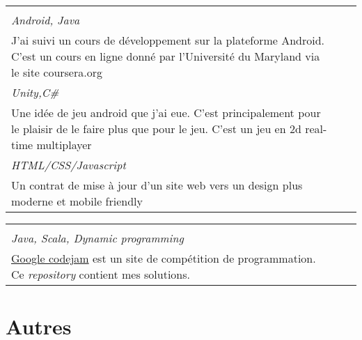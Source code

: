 \documentclass[a4paper,10pt]{extarticle}
\makeatletter
\newlength{\indicewidth}%
\newlength{\separatorcolumnwidth}%
\newlength{\maincolumnwidth}%
\newcommand{\indicestyle}[1]{\slshape\textcolor{color0}{#1}}
\newcommand{\cvboxitem}[5]{}
\renewcommand{\cvboxitem}[5]{%
	\begin{minipage}[t]{\linewidth}
	
	$\bullet$ \textbf{#1}\ifthenelse{\equal{#2}{}}{}{, {\slshape #2}}\par%
	\raggedright{\scriptsize\href{#3}{#3}}\\
	{\small\slshape\color{Bittersweet} {#4}}\vspace{0.2em}\\
	{#5}

	\end{minipage}
	
}
\newcommand{\cvtriplebox}[3]{}
\renewcommand{\cvtriplebox}[3]{
\begin{tabular*}{\linewidth}{  
                   p{\dimexpr 0.33\linewidth-1\tabcolsep } 
                   p{\dimexpr 0.33\linewidth-1\tabcolsep }  
                   p{\dimexpr 0.33\linewidth-1\tabcolsep } 
                   } 
{#1}&{#2}&{#3}\tabularnewline
\end{tabular*}
}
\def\middleline{
\raisebox{0.35em}{\line(1,0){50}}
}
\renewcommand{\subsection}[1]{
\par\addvspace{3ex}\hspace{-2em}
\begin{tabular}{@{}p{\indicewidth}@{\hspace{\separatorcolumnwidth}}p{\maincolumnwidth}@{}}%
    \raggedleft\indicestyle{}\middleline & { \strut\bfseries {#1} }%
    \par
\end{tabular}%
\vspace{-0.5em}
}
\makeatother
\begin{document}
\cvtriplebox
{\cvboxitem{Programming Mobile Applications for Android Handheld Systems}{}{https://class.coursera.org/android-001}{Android, Java}
{J'ai suivi un cours de développement sur la plateforme Android. C'est un cours en ligne donné par l'Université du Maryland via le site coursera.org}
}
{\cvboxitem{Jeu Android}{en cours}{https://github.com/GitMyCode/laser-game}{Unity,C\#}{Une idée de jeu android que j'ai eue. C'est principalement pour le plaisir de le faire plus que pour le jeu. C'est un jeu en 2d real-time multiplayer}}
{
\cvboxitem{Site Web}{contrat}{http://gitmycode.github.io/avocatmontreal/}{ HTML/CSS/Javascript}
{Un contrat de mise à jour d'un site web vers un design plus moderne et mobile friendly }
}
\cvtriplebox
{}
{\cvboxitem{Google Codejam}{}{https://github.com/GitMyCode/code-jam}{Java, Scala, Dynamic programming}
{\href{https://code.google.com/codejam}{Google codejam} est un site de compétition de programmation. Ce \emph{repository} contient mes solutions. }}

{}



\vspace{-2em}
\section{Autres}\vspace{-2.5em}
\begin{comment}
\begin{tabular*}{\linewidth}{  
                   p{\dimexpr 0.33\linewidth-1\tabcolsep } 
                   p{\dimexpr 0.66\linewidth-1\tabcolsep }  
                   }
\begin{minipage}[t]{\linewidth}                   
\subsection{Langue}
\begin{itemize}
\item[$\bullet$] Français langue maternelle 
\item Anglais fonctionnel
\end{itemize}
\end{minipage}
&
\begin{minipage}[t]{\linewidth}
\subsection{Intérêt}
\begin{itemize}
\item[$\bullet$] Programmation : Toujours à la recherche de projets intéressants !
\item Guitare
\end{itemize}
\end{minipage}
\tabularnewline

\end{tabular*}
\end{comment}
\end{document}

